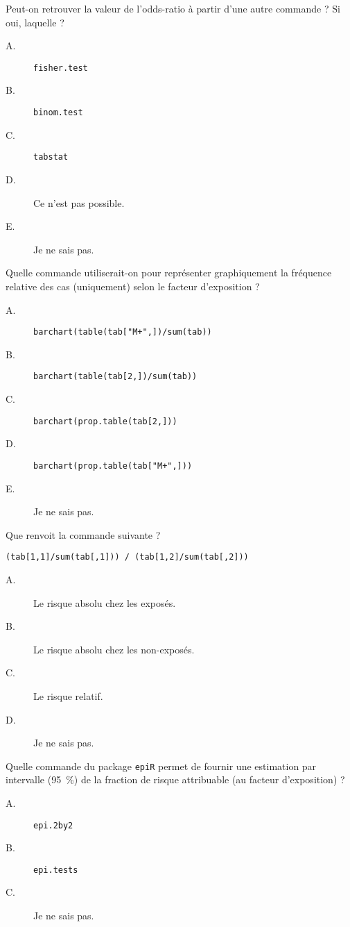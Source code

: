 \documentclass[11pt]{report}
\theoremstyle{definition}
\begin{document}
\begin{description}
\begin{description}
  \end{description}  
\item[\bf 1.4]  Peut-on retrouver la valeur de
  l'odds-ratio à partir d'une autre commande ? Si oui, laquelle ?
  \begin{description}
  \item[A.] \verb|fisher.test|
  \item[B.] \verb|binom.test|
  \item[C.] \verb|tabstat|
  \item[D.] Ce n'est pas possible.
  \item[E.] Je ne sais pas.
  \end{description}  
\item[\bf 1.5]  Quelle commande utiliserait-on pour
  représenter graphiquement la fréquence relative des cas (uniquement) selon
  le facteur d'exposition ?
  \begin{description}
  \item[A.] \verb|barchart(table(tab["M+",])/sum(tab))|
  \item[B.] \verb|barchart(table(tab[2,])/sum(tab))|
  \item[C.] \verb|barchart(prop.table(tab[2,]))|
  \item[D.] \verb|barchart(prop.table(tab["M+",]))|
  \item[E.] Je ne sais pas.
  \end{description}  
\item[\bf 1.6]  Que renvoit la commande suivante ? 
\begin{verbatim}
(tab[1,1]/sum(tab[,1])) / (tab[1,2]/sum(tab[,2]))
\end{verbatim}
  \begin{description}
  \item[A.] Le risque absolu chez les exposés.
  \item[B.] Le risque absolu chez les non-exposés.      
  \item[C.] Le risque relatif.
  \item[D.] Je ne sais pas.
  \end{description}
\item[\bf 1.7]  Quelle commande du package
  \texttt{epiR} permet de fournir une estimation par intervalle (95~\%) de
  la fraction de risque attribuable (au facteur d'exposition) ?
  \begin{description}
  \item[A.] \verb|epi.2by2|
  \item[B.] \verb|epi.tests|
  \item[C.] Je ne sais pas.
  \end{description}  
\end{description}
\end{document}
